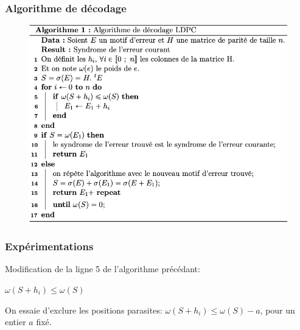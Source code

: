 \documentclass{beamer}
\begin{document}
    \begin{frame}
        \frametitle{Algorithme de décodage}
        \begin{figure}[!h]
            \centering
            \includegraphics[scale=0.65]{algo.png}  
            \label{fig:algo}
        \end{figure}
    \end{frame}

    \begin{frame}
        \frametitle{Expérimentations}
        Modification de la ligne 5 de l'algorithme précédant: 
        \begin{center}
            $\omega(S + h_{i}) \le \omega(S)$
        \end{center}
        \vspace{0.4cm}
        On essaie d'exclure les positions parasites:
        $\omega(S + h_{i}) \le \omega(S) - a$, pour un entier $a$ fixé.
    \end{frame}
\end{document}
